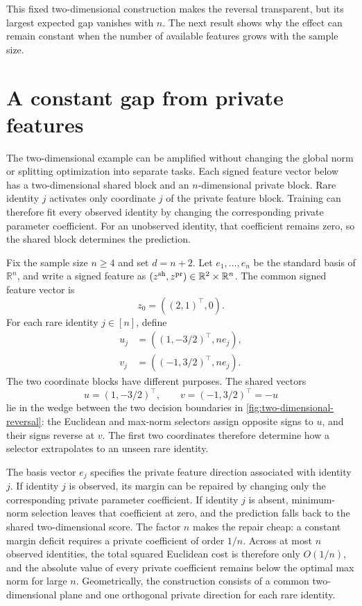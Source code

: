 \documentclass[11pt,twoside]{article}
\newcommand{\R}{\mathbb R}
\theoremstyle{definition}
\theoremstyle{remark}
\begin{document}
This fixed two-dimensional construction makes the reversal transparent, but
its largest expected gap vanishes with $n$. The next result shows why the
effect can remain constant when the number of available features grows with
the sample size.

\section{A constant gap from private features}
\label{sec:amplification}

The two-dimensional example can be amplified without changing the global
norm or splitting optimization into separate tasks. Each signed feature vector
below has a two-dimensional shared block and an $n$-dimensional private block.
Rare identity $j$ activates only coordinate $j$ of the private feature block.
Training can therefore fit every observed identity by changing the
corresponding private parameter coefficient. For an unobserved identity, that
coefficient remains zero, so the shared block determines the prediction.

Fix the sample size $n\ge4$ and set $d=n+2$. Let
$e_1,\ldots,e_n$ be the standard basis of $\R^n$, and write a signed feature
as $(z^{\rm sh},z^{\rm pr})\in\R^2\times\R^n$. The common signed feature
vector is
\[
 z_0=((2,1)^\top,0).
\]
For each rare identity $j\in[n]$, define
\begin{align}
 u_j&=((1,-3/2)^\top,ne_j),
 \label{eq:rare-u}\\
 v_j&=((-1,3/2)^\top,ne_j).
 \label{eq:rare-v}
\end{align}
The two coordinate blocks have different purposes. The shared vectors
\[
 u=(1,-3/2)^\top,
 \qquad
 v=(-1,3/2)^\top=-u
\]
lie in the wedge between the two decision boundaries in
\cref{fig:two-dimensional-reversal}: the Euclidean and max-norm selectors
assign opposite signs to $u$, and their signs reverse at $v$. The first two
coordinates therefore determine how a selector extrapolates to an unseen
rare identity.

The basis vector $e_j$ specifies the private feature direction associated with
identity $j$. If identity $j$ is observed, its margin can be repaired by
changing only the corresponding private parameter coefficient. If identity
$j$ is absent, minimum-norm selection leaves that coefficient at zero, and the
prediction falls back to the shared two-dimensional score.
The factor $n$ makes the repair cheap: a constant margin deficit requires a
private coefficient of order $1/n$. Across at most $n$ observed identities,
the total squared Euclidean cost is therefore only $O(1/n)$, and the absolute
value of every private coefficient remains below the optimal max norm for
large $n$. Geometrically,
the construction consists of a common two-dimensional plane and one
orthogonal private direction for each rare identity.
\end{document}
